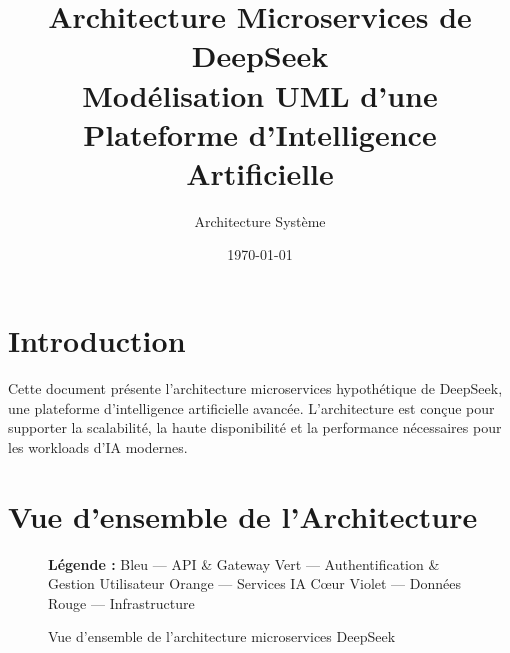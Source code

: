 \documentclass[12pt,a4paper]{article}
\title{\textbf{Architecture Microservices de DeepSeek} \\ 
       \large Modélisation UML d'une Plateforme d'Intelligence Artificielle}
\author{Architecture Système}
\date{\today}
\begin{document}
\maketitle
\tableofcontents
\newpage

\section{Introduction}
Cette document présente l'architecture microservices hypothétique de DeepSeek, une plateforme d'intelligence artificielle avancée. L'architecture est conçue pour supporter la scalabilité, la haute disponibilité et la performance nécessaires pour les workloads d'IA modernes.

\section{Vue d'ensemble de l'Architecture}
\begin{figure}[H]
\centering
{}
\caption{Vue d'ensemble de l'architecture microservices DeepSeek}
\vspace{0.3cm}
\begin{center}
\colorbox{gray!10}{
\begin{minipage}{0.9\textwidth}
\textbf{Légende :} 
\textcolor{blue!60}{Bleu} — API \& Gateway \hspace{0.5cm}
\textcolor{green!60}{Vert} — Authentification \& Gestion Utilisateur \hspace{0.5cm}
\textcolor{orange!80!black}{Orange} — Services IA Cœur \hspace{0.5cm}
\textcolor{purple!70!black}{Violet} — Données \hspace{0.5cm}
\textcolor{red!70!black}{Rouge} — Infrastructure
\end{minipage}}
\end{center}
\end{figure}
\end{document}
